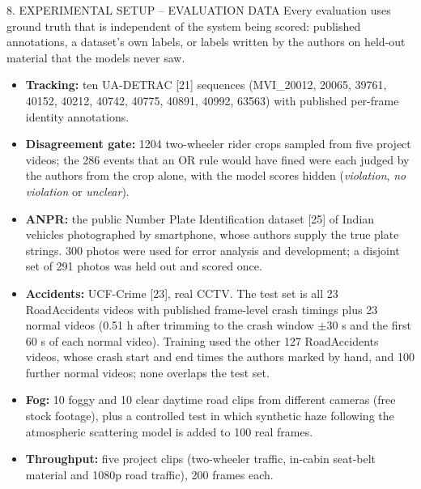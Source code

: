 \documentclass[aspectratio=169,10pt,t]{beamer}
\begin{document}
\begin{frame}{8. EXPERIMENTAL SETUP -- EVALUATION DATA}
\scriptsize
Every evaluation uses ground truth that is independent of the system being scored: published annotations, a dataset's
own labels, or labels written by the authors on held-out material that the models never saw.
\begin{itemize}\setlength{\itemsep}{0.25em}
\item \textbf{Tracking:} ten UA-DETRAC [21] sequences (MVI\_20012, 20065, 39761, 40152, 40212, 40742, 40775, 40891,
40992, 63563) with published per-frame identity annotations.
\item \textbf{Disagreement gate:} 1204 two-wheeler rider crops sampled from five project videos; the 286 events that
an OR rule would have fined were each judged by the authors from the crop alone, with the model scores hidden
(\emph{violation}, \emph{no violation} or \emph{unclear}).
\item \textbf{ANPR:} the public Number Plate Identification dataset [25] of Indian vehicles photographed by
smartphone, whose authors supply the true plate strings. 300 photos were used for error analysis and development; a
disjoint set of 291 photos was held out and scored once.
\item \textbf{Accidents:} UCF-Crime [23], real CCTV. The test set is all 23 RoadAccidents videos with published
frame-level crash timings plus 23 normal videos (0.51 h after trimming to the crash window $\pm$30 s and the first
60 s of each normal video). Training used the other 127 RoadAccidents videos, whose crash start and end times the
authors marked by hand, and 100 further normal videos; none overlaps the test set.
\item \textbf{Fog:} 10 foggy and 10 clear daytime road clips from different cameras (free stock footage), plus a
controlled test in which synthetic haze following the atmospheric scattering model is added to 100 real frames.
\item \textbf{Throughput:} five project clips (two-wheeler traffic, in-cabin seat-belt material and 1080p road
traffic), 200 frames each.
\end{itemize}
\end{frame}
\end{document}
